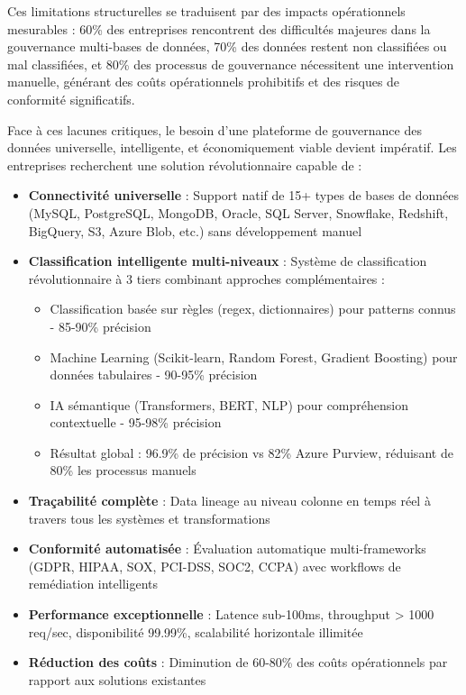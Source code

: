 Ces limitations structurelles se traduisent par des impacts opérationnels mesurables : 60\% des entreprises rencontrent des difficultés majeures dans la gouvernance multi-bases de données, 70\% des données restent non classifiées ou mal classifiées, et 80\% des processus de gouvernance nécessitent une intervention manuelle, générant des coûts opérationnels prohibitifs et des risques de conformité significatifs.

Face à ces lacunes critiques, le besoin d'une plateforme de gouvernance des données universelle, intelligente, et économiquement viable devient impératif. Les entreprises recherchent une solution révolutionnaire capable de :

\begin{itemize}
    \item \textbf{Connectivité universelle} : Support natif de 15+ types de bases de données (MySQL, PostgreSQL, MongoDB, Oracle, SQL Server, Snowflake, Redshift, BigQuery, S3, Azure Blob, etc.) sans développement manuel
    
    \item \textbf{Classification intelligente multi-niveaux} : Système de classification révolutionnaire à 3 tiers combinant approches complémentaires :
    \begin{itemize}
        \item Classification basée sur règles (regex, dictionnaires) pour patterns connus - 85-90\% précision
        \item Machine Learning (Scikit-learn, Random Forest, Gradient Boosting) pour données tabulaires - 90-95\% précision
        \item IA sémantique (Transformers, BERT, NLP) pour compréhension contextuelle - 95-98\% précision
        \item Résultat global : 96.9\% de précision vs 82\% Azure Purview, réduisant de 80\% les processus manuels
    \end{itemize}
    
    \item \textbf{Traçabilité complète} : Data lineage au niveau colonne en temps réel à travers tous les systèmes et transformations
    
    \item \textbf{Conformité automatisée} : Évaluation automatique multi-frameworks (GDPR, HIPAA, SOX, PCI-DSS, SOC2, CCPA) avec workflows de remédiation intelligents
    
    \item \textbf{Performance exceptionnelle} : Latence sub-100ms, throughput > 1000 req/sec, disponibilité 99.99\%, scalabilité horizontale illimitée
    
    \item \textbf{Réduction des coûts} : Diminution de 60-80\% des coûts opérationnels par rapport aux solutions existantes
\end{itemize}

